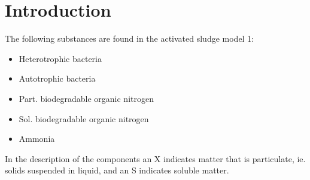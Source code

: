 \section*{Introduction}\label{sec:Introduction} 
%
%
%
%
%
%
%
%
%
The following substances are found in the activated sludge model 1:
\begin{itemize}
    \item Heterotrophic bacteria
    \item Autotrophic bacteria
    \item Part. biodegradable organic nitrogen
    \item Sol. biodegradable organic nitrogen
    \item Ammonia 
\end{itemize}

In the description of the components an X indicates matter that is particulate, ie. solids suspended in liquid, and an S indicates soluble matter.

